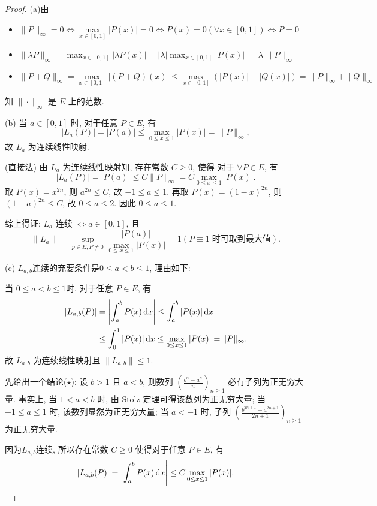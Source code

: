 \begin{proof}
(a)由
\begin{itemize}
    \item $\|P\|_\infty =0\Leftrightarrow\max\limits_{x\in [0,1]}|P(x)|=0\Leftrightarrow P(x)=0(\forall x\in [0,1])\Leftrightarrow P=0$
    \item $\|\lambda P\|_\infty =\max_{x\in [0,1]}|\lambda P(x)|=|\lambda |\max_{x\in [0,1]}|P(x)|=|\lambda|\|P\|_{\infty}$
    \item $\|P+Q\|_{\infty}=\max\limits_{x\in [0,1]}|(P+Q)(x)|\leq\max\limits_{x\in [0,1]}(|P(x)|+|Q(x)|)=\|P\|_{\infty}+\|Q\|_{\infty}$
\end{itemize}
知 $\|\cdot\|_{\infty}$ 是 $E$ 上的范数.

(b)\sufficient 
当 $a\in [0,1]$ 时, 对于任意 $P\in E$, 有
\[|L_a(P)|=|P(a)|\leq\max_{0\leq x\leq 1}|P(x)|=\|P\|_{\infty},\]
故 $L_a$ 为连续线性映射.

\necessary 
(直接法) 由 $L_a$ 为连续线性映射知, 存在常数 $C\geq 0$, 使得
对于 $\forall P\in E$, 有
\[|L_a(P)|=|P(a)|\leq C\|P\|_{\infty}=C\max_{0\leq x\leq 1}|P(x)|.\]
取 $P(x)=x^{2n}$, 则 $a^{2n}\leq C$, 故 $-1\leq a\leq 1$.
再取 $P(x)=(1-x)^{2n}$, 则 $(1-a)^{2n}\leq C$, 故 $0\leq a\leq 2$.
因此 $0\leq a\leq 1$.

综上得证: $L_a$ 连续 $\Leftrightarrow a\in [0,1]$, 且
\[\|L_a\|=\sup\limits_{p\in E,P\neq 0}\frac{|P(a)|}{\max_{0\leq x\leq 1}|P(x)|}=1(P\equiv 1\;\text{时可取到最大值}).\]

(c) $L_{a,b}$连续的充要条件是$0\leq a<b\leq 1$, 理由如下:

\sufficient
当 $0\leq a<b\leq 1$时, 对于任意 $P\in E$, 有
\begin{align*}
    |L_{a,b}(P)|
    &=\left\lvert\int_a^b P(x)\mathop{}\!\mathrm{d} x\right\rvert\leq\int_a^b |P(x)|\mathop{}\!\mathrm{d} x \\
    &\leq\int_0^1 |P(x)|\mathop{}\!\mathrm{d} x\leq\max_{0\leq x\leq 1}|P(x)|=\|P\|_{\infty}.
\end{align*}
故 $L_{a,b}$ 为连续线性映射且 $\|L_{a,b}\|\leq 1$.

\necessary
先给出一个结论($\star$):
设 $b>1$ 且 $a<b$, 则数列 $\left(\frac{b^n-a^n}{n}\right)_{n\geq 1}$
必有子列为正无穷大量.
事实上, 当 $1<a<b$ 时, 由 Stolz 定理可得该数列为正无穷大量;
当 $-1\leq a\leq 1$ 时, 该数列显然为正无穷大量;
当 $a<-1$ 时, 子列 $\left(\frac{b^{2n+1}-a^{2n+1}}{2n+1}\right)_{n\geq 1}$
为正无穷大量.

因为$L_{a,b}$连续, 所以存在常数 $C\geq 0$ 使得对于任意 $P\in E$, 有
\[|L_{a,b}(P)|=\left\lvert\int_a^b P(x)\mathop{}\!\mathrm{d} x\right\rvert\leq C\max_{0\leq x\leq 1}|P(x)|.\]


\end{proof}
